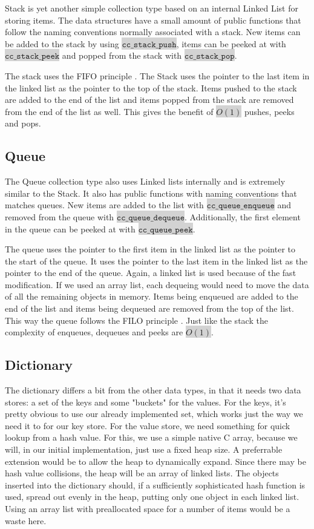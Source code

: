 \documentclass[table]{ituthesis}
\newcommand{\highlight}[1]{\colorbox{lightGray}{$\displaystyle \texttt{#1}$}}
\begin{document}
	Stack is yet another simple collection type based on an internal Linked List for storing items. The data structures have a small amount of public functions that follow the naming conventions normally associated with a stack. New items can be added to the stack by using \highlight{cc\_stack\_push}, items can be peeked at with \highlight{cc\_stack\_peek} and popped from the stack with \highlight{cc\_stack\_pop}.

	The stack uses the FIFO principle \cite[p. 200]{Algorithms2002}. The Stack uses the pointer to the last item in the linked list as the pointer to the top of the stack. Items pushed to the stack are added to the end of the list and items popped from the stack are removed from the end of the list as well. This gives the benefit of \highlight{$O(1)$} pushes, peeks and pops.
	
	\subsection{Queue}
	
	The Queue collection type also uses Linked lists internally and is extremely similar to the Stack. It also has public functions with naming conventions that matches queues. New items are added to the list with \highlight{cc\_queue\_enqueue} and removed from the queue with \highlight{cc\_queue\_dequeue}. Additionally, the first element in the queue can be peeked at with \highlight{cc\_queue\_peek}.

	The queue uses the pointer to the first item in the linked list as the pointer to the start of the queue. It uses the pointer to the last item in the linked list as the pointer to the end of the queue. Again, a linked list is used because of the fast modification. If we used an array list, each dequeing would need to move the data of all the remaining objects in memory. Items being enqueued are added to the end of the list and items being dequeued are removed from the top of the list. This way the queue follows the FILO principle \cite[p. 200]{Algorithms2002}. Just like the stack the complexity of enqueues, dequeues and peeks are \highlight{$O(1)$}.
	
	\subsection{Dictionary}
	
	The dictionary differs a bit from the other data types, in that it needs two data stores: a set of the keys and some "buckets" for the values. For the keys, it's pretty obvious to use our already implemented set, which works just the way we need it to for our key store. For the value store, we need something for quick lookup from a hash value. For this, we use a simple native C array, because we will, in our initial implementation, just use a fixed heap size. A preferrable extension would be to allow the heap to dynamically expand. Since there may be hash value collisions, the heap will be an array of linked lists. The objects inserted into the dictionary should, if a sufficiently sophisticated hash function is used, spread out evenly in the heap, putting only one object in each linked list. Using an array list with preallocated space for a number of items would be a waste here.
\end{document}
